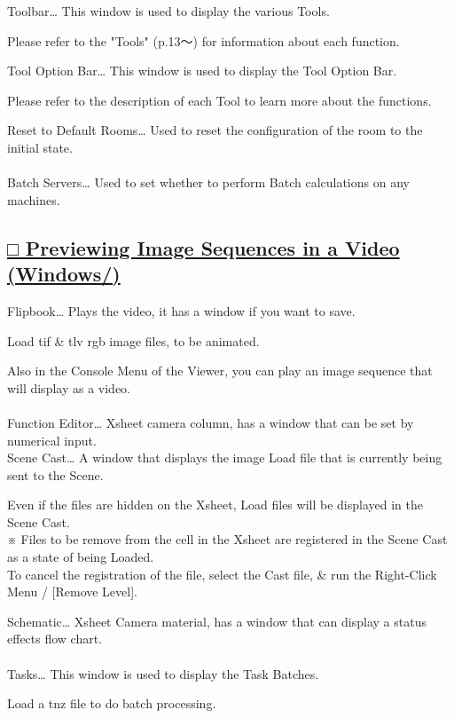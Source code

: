 \documentclass[a4paper,10pt]{article}
\begin{document}
\normalsize
\noindent Toolbar… This window is used to display the various Tools.\par
\footnotesize
\noindent Please refer to the "Tools" (p.13～) for information about each function.\\[-0.5em]
\par
\normalsize
\noindent Tool Option Bar… This window is used to display the Tool Option Bar.\par
\footnotesize
\noindent Please refer to the description of each Tool to learn more about the functions.\\[-0.5em]
\par
\normalsize
\noindent Reset to Default Rooms… Used to reset the configuration of the room to the initial state.\\[-0.5em]
\\
Batch Servers… Used to set whether to perform Batch calculations on any machines.

\newpage

\subsection*{\uline{□ Previewing Image Sequences in a Video (Windows/)}}

\normalsize
\noindent Flipbook… Plays the video, it has a window if you want to save.\par
\footnotesize
\noindent Load tif \& tlv rgb image files, to be animated.\\
\par
\normalsize
\noindent Also in the Console Menu of the Viewer, you can play an image sequence that will display as a video.\\
\\
Function Editor… Xsheet camera column, has a window that can be set by numerical input.\\[1em]
Scene Cast… A window that displays the image Load file that is currently being sent to the Scene.\par
\footnotesize
\noindent Even if the files are hidden on the Xsheet, Load files will be displayed in the Scene Cast.\\
※ Files to be remove from the cell in the Xsheet are registered in the Scene Cast as a state of being Loaded.\\
To cancel the registration of the file, select the Cast file, \& run the Right-Click Menu / [Remove Level].\\
\par
\normalsize
\noindent Schematic… Xsheet Camera material, has a window that can display a status effects flow chart.\\
\\
Tasks… This window is used to display the Task Batches.\par
\footnotesize
\noindent Load a tnz file to do batch processing.\\
\\
\end{document}
